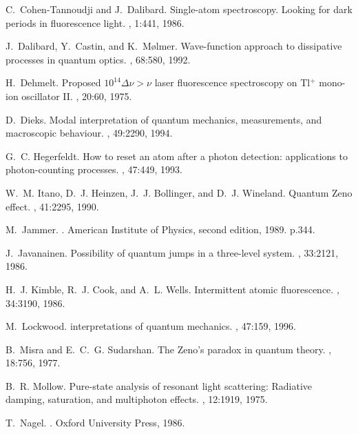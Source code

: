 \documentclass[12pt,a4paper,reqno]{article}
\renewcommand{\(}{\left(}
\renewcommand{\)}{\right)}
\newcommand{\<}{\langle}
\renewcommand{\>}{\rangle}
\theoremstyle{plain} %
\theoremstyle{definition}
\theoremstyle{remark}
\begin{document}
\begin{thebibliography}{10}
C.~Cohen-Tannoudji and J.~Dalibard.
\newblock Single-atom spectroscopy. {L}ooking for dark periods in fluorescence
  light.
, 1:441, 1986.

J.~Dalibard, Y.~Castin, and K.~M{\o}lmer.
\newblock Wave-function approach to dissipative processes in quantum optics.
, 68:580, 1992.

H.~Dehmelt.
\newblock Proposed {$10^{14}\Delta\nu > \nu$} laser fluorescence spectroscopy
  on {T}l$^+$ mono-ion oscillator {II}.
, 20:60, 1975.

D.~Dieks.
\newblock Modal interpretation of quantum mechanics, measurements, and
  macroscopic behaviour.
, 49:2290, 1994.

G.~C. Hegerfeldt.
\newblock How to reset an atom after a photon detection: applications to
  photon-counting processes.
, 47:449, 1993.

W.~M. Itano, D.~J. Heinzen, J.~J. Bollinger, and D.~J. Wineland.
\newblock Quantum {Z}eno effect.
, 41:2295, 1990.

M.~Jammer.
.
\newblock American Institute of Physics, second edition, 1989.
\newblock p.344.

J.~Javanainen.
\newblock Possibility of quantum jumps in a three-level system.
, 33:2121, 1986.

H.~J. Kimble, R.~J. Cook, and A.~L. Wells.
\newblock Intermittent atomic fluorescence.
, 34:3190, 1986.

M.~Lockwood.
 interpretations of quantum mechanics.
, 47:159, 1996.

B.~Misra and E.~C.~G. Sudarshan.
\newblock The {Z}eno's paradox in quantum theory.
, 18:756, 1977.

B.~R. Mollow.
\newblock Pure-state analysis of resonant light scattering: Radiative damping,
  saturation, and multiphoton effects.
, 12:1919, 1975.

T.~Nagel.
.
\newblock Oxford University Press, 1986.


\end{thebibliography}
\end{document}
